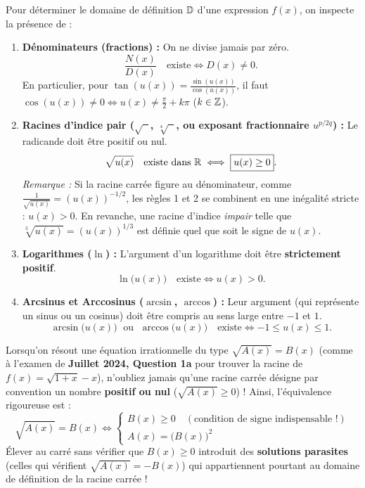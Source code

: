 \begin{theoreme}
Pour déterminer le domaine de définition $\mathbb{D}$ d'une expression $f(x)$, on inspecte la présence de :
\begin{enumerate}
    \item \textbf{Dénominateurs (fractions) :} On ne divise jamais par zéro.
    \[
        \frac{N(x)}{D(x)} \quad \text{existe} \iff \boxed{D(x) \neq 0}.
    \]
    En particulier, pour $\tan(u(x)) = \frac{\sin(u(x))}{\cos(u(x))}$, il faut $\cos(u(x)) \neq 0 \iff u(x) \neq \frac{\pi}{2} + k\pi$ ($k \in \mathbb{Z}$).
    \item \textbf{Racines d'indice pair ($\sqrt{\phantom{u}}$, $\sqrt[4]{\phantom{u}}$, ou exposant fractionnaire $u^{p/2q}$) :} Le radicande doit être positif ou nul.
    \[
        \sqrt{u(x)} \quad \text{existe dans } \mathbb{R} \iff \boxed{u(x) \ge 0}.
    \]
    \emph{Remarque :} Si la racine carrée figure au dénominateur, comme $\frac{1}{\sqrt{u(x)}} = (u(x))^{-1/2}$, les règles 1 et 2 se combinent en une inégalité stricte : $u(x) > 0$. En revanche, une racine d'indice \emph{impair} telle que $\sqrt[3]{u(x)} = (u(x))^{1/3}$ est définie quel que soit le signe de $u(x)$.
    \item \textbf{Logarithmes ($\ln$) :} L'argument d'un logarithme doit être \textbf{strictement positif}.
    \[
        \ln\bigl(u(x)\bigr) \quad \text{existe} \iff \boxed{u(x) > 0}.
    \]
    \item \textbf{Arcsinus et Arccosinus ($\arcsin$, $\arccos$) :} Leur argument (qui représente un sinus ou un cosinus) doit être compris au sens large entre $-1$ et $1$.
    \[
        \arcsin\bigl(u(x)\bigr) \;\text{ ou }\; \arccos\bigl(u(x)\bigr) \quad \text{existe} \iff \boxed{-1 \le u(x) \le 1}.
    \]
\end{enumerate}
\end{theoreme}

\begin{attention}
Lorsqu'on résout une équation irrationnelle du type $\sqrt{A(x)} = B(x)$ (comme à l'examen de \textbf{Juillet 2024, Question 1a} pour trouver la racine de $f(x) = \sqrt{1+x} - x$), n'oubliez jamais qu'une racine carrée désigne par convention un nombre \textbf{positif ou nul} ($\sqrt{A(x)} \ge 0$) !
Ainsi, l'équivalence rigoureuse est :
\[
    \boxed{\sqrt{A(x)} = B(x) \iff \begin{cases} B(x) \ge 0 \quad (\text{condition de signe indispensable !}) \\ A(x) = \bigl(B(x)\bigr)^2 \end{cases}}
\]
Élever au carré sans vérifier que $B(x) \ge 0$ introduit des \textbf{solutions parasites} (celles qui vérifient $\sqrt{A(x)} = -B(x)$) qui appartiennent pourtant au domaine de définition de la racine carrée !
\end{attention}

